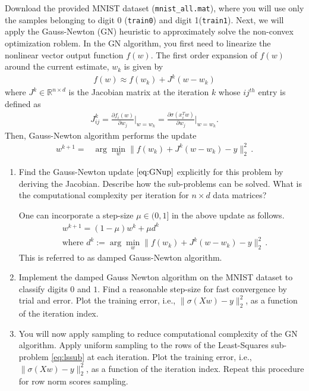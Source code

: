 \begin{enumerate}
%
Download the provided MNIST dataset (\texttt{mnist\_all.mat}), where you will use only the samples belonging to digit 0 (\texttt{train0}) and digit 1(\texttt{train1}). Next, we will apply the Gauss-Newton (GN) heuristic to approximately solve the non-convex optimization roblem. In the GN algorithm, you first need to linearize the nonlinear vector output function $f(w)$.
The first order expansion of $f(w)$ around the current estimate, $w_k$ is given by
\begin{align}\label{eq:lin}
    f(w)\approx f(w_k)+J^k(w-w_k)
\end{align}
where $J^k \in \mathbb{R}^{n \times d}$ is the Jacobian matrix at the iteration $k$ whose $ij^{th}$ entry is defined as
\begin{align*}
    J_{ij}^{k}= \frac{\partial f_i( w)}{\partial w_j} \Bigg \vert_{w=w_k}=\frac{\partial \sigma(x_i^T w)}{\partial w_j} \Bigg \vert_{w=w_k}.
\end{align*}
Then, Gauss-Newton algorithm performs the update
%
\begin{align}
    w^{k+1}= 
    &\arg \min_w \|f(w_k)+J^k(w-w_k) - y\|_2^2\,.
    \label{eq:GNup}
\end{align}
%
\begin{enumerate}
    \item Find the Gauss-Newton update $\eqref{eq:GNup}$ explicitly for this problem by deriving the Jacobian. Describe how the sub-problems can be solved. What is the computational complexity per iteration for $n\times d$ data matrices?
%

One can incorporate a step-size $\mu \in (0,1]$ in the above update as follows.
%
    \begin{align}
    &w^{k+1} = (1-\mu)w^k + \mu d^k \nonumber\\ 
    & \mbox{where } d^k:=\arg \min_w \|f(w_k)+J^k(w-w_k) - y\|_2^2\,. \label{eq:lssub}
\end{align}
This is referred to as damped Gauss-Newton algorithm.
%
    \item Implement the damped Gauss Newton algorithm on the MNIST dataset to classify digits $0$ and $1$. Find a reasonable step-size for fast convergence by trial and error. Plot the training error, i.e., $\|\sigma(Xw)-y\|_2^2$, as a function of the iteration index.

    \item You will now apply sampling to reduce computational complexity of the GN algorithm. Apply uniform sampling to the rows of the Least-Squares sub-problem \eqref{eq:lssub} at each iteration. Plot the training error, i.e., $\|\sigma(Xw)-y\|_2^2$, as a function of the iteration index. Repeat this procedure for row norm scores sampling.
\end{enumerate}
\solution{
}



\end{enumerate}
